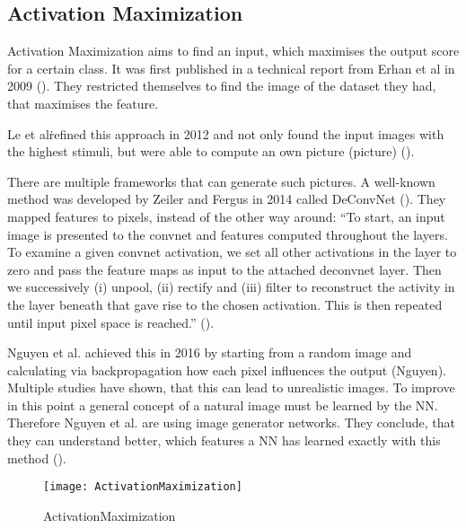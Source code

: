 \subsection{Activation Maximization}
Activation Maximization aims to find an input, which maximises the output score for a certain class. It was first published in a technical report from Erhan et al in 2009 (). They restricted themselves to find the image of the dataset they had, that maximises the feature.
\par
Le et al\. refined this approach in 2012 and not only found the input images with the highest stimuli, but were able to compute an own picture (picture) ().

There are multiple frameworks that can generate such pictures. A well-known method was developed by Zeiler and Fergus in 2014 called DeConvNet (). They mapped features to pixels, instead of the other way around:
“To start, an input image is presented to the convnet and features computed throughout the layers. To examine a given convnet activation, we set all other activations in the layer to zero and pass the feature maps as input to the attached deconvnet layer. Then we successively (i) unpool, (ii) rectify and (iii) filter to reconstruct the activity in the layer beneath that gave rise to the chosen activation. This is then repeated until input pixel space is reached.” ().
\par
Nguyen et al. achieved this in 2016 by starting from a random image and calculating via backpropagation how each pixel influences the output (Nguyen). Multiple studies have shown, that this can lead to unrealistic images. To improve in this point a general concept of a natural image must be learned by the NN. Therefore Nguyen et al. are using image generator networks. They conclude, that they can understand better, which features a NN has learned exactly with this method ().
\begin{figure*}
    \center
    \texttt{[image: ActivationMaximization]}
    \caption{ActivationMaximization}
\end{figure*}

